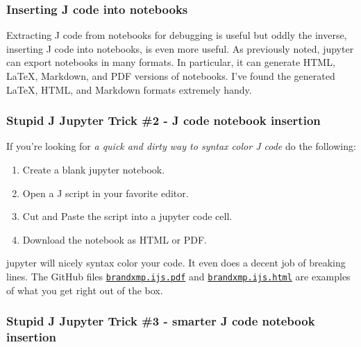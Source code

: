 \hypertarget{inserting-j-code-into-notebooks}{%
\subsubsection*{Inserting J code into
notebooks}\label{inserting-j-code-into-notebooks}}

Extracting J code from notebooks for debugging is useful but oddly the
inverse, inserting J code into notebooks, is even more useful. As
previously noted, jupyter can export notebooks in many formats. In
particular, it can generate HTML, \LaTeX, Markdown, and PDF versions of
notebooks. I've found the generated \LaTeX, HTML, and Markdown formats
extremely handy.

\hypertarget{stupid-j-jupyter-trick-2---j-code-notebook-insertion}{%
\subsubsection*{Stupid J Jupyter Trick \#2 - J code notebook
insertion}\label{stupid-j-jupyter-trick-2---j-code-notebook-insertion}}

If you're looking for \emph{a quick and dirty way to syntax color J
code} do the following:

\begin{enumerate}
\def\labelenumi{\arabic{enumi}.}
\tightlist
\item
  Create a blank jupyter notebook.
\item
  Open a J script in your favorite editor.
\item
  Cut and Paste the script into a jupyter code cell.
\item
  Download the notebook as HTML or PDF.
\end{enumerate}

jupyter will nicely syntax color your code. It even does a decent job of
breaking lines. The GitHub files
\href{https://github.com/bakerjd99/jacks/blob/master/brandxmp/jupyter/brandxmp.ijs.pdf}{\texttt{brandxmp.ijs.pdf}}
and
\href{https://github.com/bakerjd99/jacks/blob/master/brandxmp/jupyter/brandxmp.ijs.html}{\texttt{brandxmp.ijs.html}}
are examples of what you get right out of the box.

\hypertarget{stupid-j-jupyter-trick-3---smarter-j-code-notebook-insertion}{%
\subsubsection*{Stupid J Jupyter Trick \#3 - smarter J code notebook
insertion}\label{stupid-j-jupyter-trick-3---smarter-j-code-notebook-insertion}}

